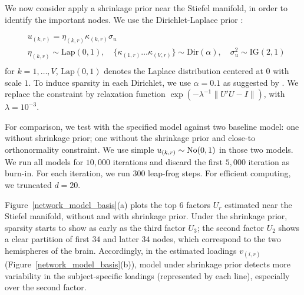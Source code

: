 \documentclass[10pt,fleqn]{article} \pdfoutput=1
\DeclareMathOperator{\1}{\mathbbm{1}} \DeclareMathOperator{\bigO}{\mc O}
\begin{document}

We now consider apply a shrinkage prior near the Stiefel manifold, in order to  identify the important nodes. We use the Dirichlet-Laplace prior \citep{bhattacharya2015dirichlet}:

\begin{equation*} \begin{aligned}
		& u_{(k,r)}= \eta_{(k,r)}\kappa_{(k,r)}\sigma_{u} \\ 
		&
		\eta_{(k,r)}\sim \text{Lap}(0,1), \quad \{\kappa_{(1,r)}\ldots
		\kappa_{(V,r)}\} \sim \text{Dir}(\alpha), \quad \sigma^2_{u}\sim
		\text{IG}(2,1)                                                     \\\end{aligned} \end{equation*}
 for $k=1,\ldots, V$,  $\text{Lap}(0,1)$ denotes the
Laplace distribution centered at $0$ with scale $1$. To induce sparsity in each Dirichlet, we use $\alpha=0.1$ as
suggested by \cite{bhattacharya2015dirichlet}. We replace the constraint by relaxation function $\exp( - \lambda^{-1} \|U'U-I\|)$, with $\lambda=10^{-3}$.

For comparison, we test with the specified model against two baseline model:
one without
shrinkage prior; one without the shrinkage prior and 
close-to orthonormality constraint. We use simple $u_{(k,r)}\sim\operatorname{No}(0,1)$ in those two models. We run all
models for $10,000$ iterations and discard the first $5,000$ iteration as
burn-in.  For each iteration, we run $300$ leap-frog steps. For efficient
computing, we truncated $d=20$.

Figure~\ref{network_model_basis}(a) plots the top $6$ factors $U_r$ estimated near the Stiefel manifold, without and with shrinkage prior. Under the shrinkage prior, sparsity starts to show as early as the third factor $U_3$; the second factor $U_2$ shows a clear partition of first $34$ and latter $34$ nodes, which correspond to the two hemispheres of the brain. Accordingly, in the estimated loadings $v_{(i,r) }$ (Figure~\ref{network_model_basis}(b)), model under shrinkage prior detects more variability in the subject-specific loadings (represented by each line), especially over the second factor.
\end{document}
